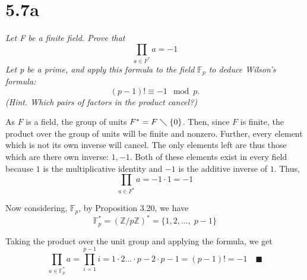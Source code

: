 \documentclass[12pt]{article}
\newcommand{\Z}{\mathbb{Z}}
\newcommand{\qed}{\quad \blacksquare}
\begin{document}
\section*{5.7a}
    \emph{Let F be a finite field. Prove that}
    \[\prod_{a \in F^*} a = -1\]
    \emph{Let p be a prime, and apply this formula to the field $\mathbb{F}_p$ to deduce Wilson's formula:}
    \[(p- 1)! \equiv - 1 \mod p.\]
    \emph{(Hint. Which pairs of factors in the product cancel?)}

    \color{blue}
        As $F$ is a field, the group of units $F^* = F \; \diagdown\; \{0\}$. Then, since $F$ is finite, the product over the group of units will be finite and nonzero. Further, every element which is not its own inverse will cancel. The only elements left are thus those which are there own inverse: $1, -1$. Both of these elements exist in every field because $1$ is the multiplicative identity and $-1$ is the additive inverse of $1$. Thus, 
        \[\prod_{a \in F^*} a = -1 \cdot 1 = -1\]

        Now considering, $\mathbb{F}_p$, by Proposition 3.20, we have 
        \[\mathbb{F}_p^* = (\Z/p\Z)^* = \{1, 2, \dots,\; p - 1\}\] 

        Taking the product over the unit group and applying the formula, we get 
        \[\prod_{a \in \mathbb{F}_p^*} a = \prod_{i=1}^{p-1} i = 1 \cdot 2 \dots \cdot p-2 \cdot p- 1 = (p - 1)! = -1 \qed\]
    \color{black}
\end{document}
